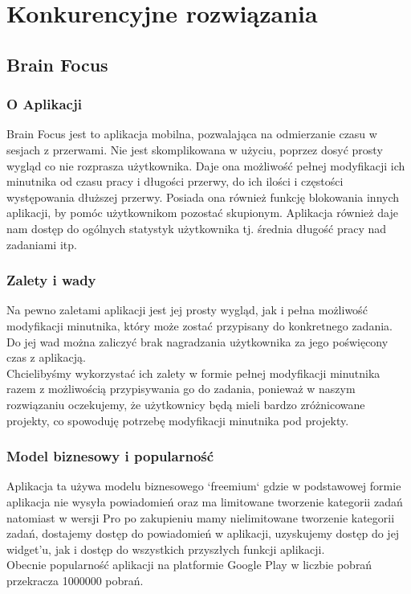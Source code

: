 \documentclass[a4paper,11pt]{report}
\begin{document}
\section {Konkurencyjne rozwiązania}
\subsection{Brain Focus}
\subsubsection{O Aplikacji}
Brain Focus jest to aplikacja mobilna, pozwalająca na odmierzanie czasu w sesjach z przerwami.
 Nie jest skomplikowana w użyciu, poprzez dosyć prosty wygląd co nie rozprasza użytkownika.
 Daje ona możliwość pełnej modyfikacji ich minutnika od czasu pracy i długości przerwy, do ich ilości i częstości występowania dłuższej przerwy.
 Posiada ona również funkcję blokowania innych aplikacji, by pomóc użytkownikom pozostać skupionym.
 Aplikacja również daje nam dostęp do ogólnych statystyk użytkownika tj. średnia długość pracy nad zadaniami itp.
\subsubsection{Zalety i wady}
Na pewno zaletami aplikacji jest jej prosty wygląd,
 jak i pełna możliwość modyfikacji minutnika,
 który może zostać przypisany do konkretnego zadania.
\vspace{0,5cm}
 \\Do jej wad można zaliczyć brak nagradzania użytkownika za jego poświęcony czas z aplikacją.
\vspace{0,5cm}
\\Chcielibyśmy wykorzystać ich zalety w formie pełnej modyfikacji minutnika razem z możliwością przypisywania go do zadania,
 ponieważ w naszym rozwiązaniu oczekujemy,
 że użytkownicy będą mieli bardzo zróżnicowane projekty, co spowoduję potrzebę modyfikacji minutnika pod projekty.
\subsubsection{Model biznesowy i popularność}
Aplikacja ta używa modelu biznesowego `freemium` gdzie w podstawowej formie aplikacja nie wysyła powiadomień
 oraz ma limitowane tworzenie kategorii zadań natomiast w wersji Pro
 po zakupieniu mamy nielimitowane tworzenie kategorii zadań,
 dostajemy dostęp do powiadomień w aplikacji,
 uzyskujemy dostęp do jej widget'u,
 jak i dostęp do wszystkich przyszłych funkcji aplikacji.
\vspace{0,5cm}\\Obecnie popularność aplikacji na platformie Google Play w liczbie pobrań przekracza 1000000 pobrań.
\end{document}
